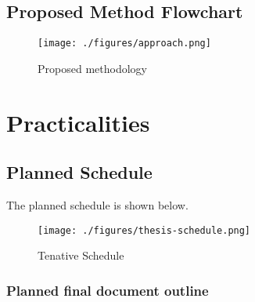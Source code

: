 \section{Proposed Method Flowchart}

\begin{figure}
      \centering
      \texttt{[image: ./figures/approach.png]}
      \caption{Proposed methodology}
      \label{method-flowchart}
\end{figure}

\chapter{Practicalities}

\section{Planned Schedule}

The planned schedule is shown below.

\begin{landscape}

      \begin{figure}
            \centering
            \texttt{[image: ./figures/thesis-schedule.png]}
            \caption{Tenative Schedule}
            \label{project-schedule}
      \end{figure}

\end{landscape}
\subsection{Planned final document outline}
